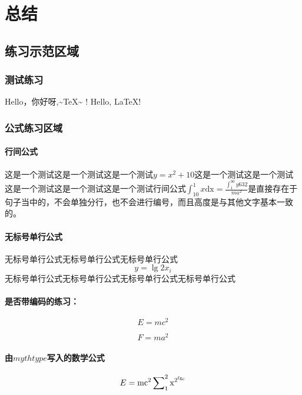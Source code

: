 \documentclass[UTF8]{ctexbook}
\begin{document}
\chapter{总结}



\section{练习示范区域}

\subsection{测试练习}
Hello，你好呀,\~{}\TeX\~{} !  
Hello, \LaTeX !

\subsection{公式练习区域}


\subsubsection{行间公式}
这是一个测试这是一个测试这是一个测试$ y=x^2+1 0$这是一个测试这是一个测试这是一个测试这是一个测试这是一个测试行间公式$\int^{1}_{10}x\mathrm{dx}=\frac{\int_{1}^{30}y632}{ma^2}$是直接存在于句子当中的，不会单独分行，也不会进行编号，而且高度是与其他文字基本一致的。



\subsubsection{无标号单行公式}
无标号单行公式无标号单行公式无标号单行公式\[ y=\lg2x_i\]无标号单行公式无标号单行公式无标号单行公式无标号单行公式


\subsubsection{是否带编码的练习：}
\begin{equation*}
\label{mass-energy}
E = m{c^2}
\end{equation*}

\begin{equation}
\label{mass-energy2}
F = m{a^2}
\end{equation}



\subsubsection{由$ mythtype $写入的数学公式}
{\textbf{\textit{\underline{}}}}
\[E = {\rm{m}}{{\rm{c}}^2}\sum\nolimits_1^2 {{{\rm{x}}^{{2^{{\rm{f}}{{\rm{g}}_{\rm{c}}}}}}}} \]
\end{document}
